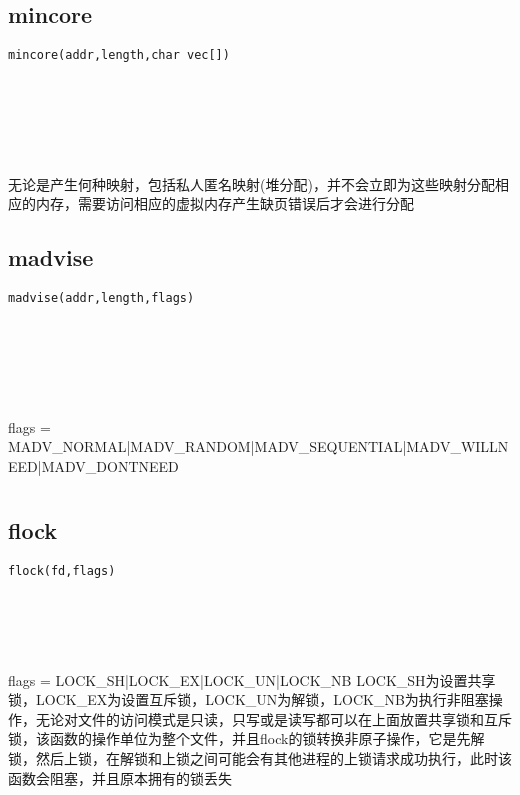 \documentclass[10pt,a4paper]{article}
\begin{document}
\subsection{mincore}
\begin{spacing}{2.0}
\lstset{language=C,numbers=none}
\begin{lstlisting}
mincore(addr,length,char vec[])
\end{lstlisting}
{\large\color[rgb]{0.2,0.4,0.6}{addr:}} \\
{\large\color[rgb]{0.2,0.4,0.6}{length:}} \\
{\large\color[rgb]{0.2,0.4,0.6}{vec[]:}}
\paragraph{ \ \ }无论是产生何种映射，包括私人匿名映射(堆分配)，并不会立即为这些映射分配相应的内存，需要访问相应的虚拟内存产生缺页错误后才会进行分配
\end{spacing}

\subsection{madvise}
\begin{spacing}{2.0}
\lstset{language=C,numbers=none}
\begin{lstlisting}
madvise(addr,length,flags)
\end{lstlisting}
{\large\color[rgb]{0.2,0.4,0.6}{addr:}} \\
{\large\color[rgb]{0.2,0.4,0.6}{length:}} \\
{\large\color[rgb]{0.2,0.4,0.6}{flags:}}
\paragraph{ \ \ }flags = MADV\_NORMAL|MADV\_RANDOM|MADV\_SEQUENTIAL|MADV\_WILLNEED|MADV\_DONTNEED
\end{spacing}

\section{\color[rgb]{0.2,0.4,0.6}{记录锁}}
\subsection{flock}
\begin{spacing}{2.0}
\lstset{language=C,numbers=none}
\begin{lstlisting}
flock(fd,flags)
\end{lstlisting}
{\large\color[rgb]{0.2,0.4,0.6}{fd:}} \\
{\large\color[rgb]{0.2,0.4,0.6}{flags:}}
\paragraph{ \ \ }flags = LOCK\_SH|LOCK\_EX|LOCK\_UN|LOCK\_NB LOCK\_SH为设置共享锁，LOCK\_EX为设置互斥锁，LOCK\_UN为解锁，LOCK\_NB为执行非阻塞操作，无论对文件的访问模式是只读，只写或是读写都可以在上面放置共享锁和互斥锁，该函数的操作单位为整个文件，并且flock的锁转换非原子操作，它是先解锁，然后上锁，在解锁和上锁之间可能会有其他进程的上锁请求成功执行，此时该函数会阻塞，并且原本拥有的锁丢失
\end{spacing}
\end{document}
